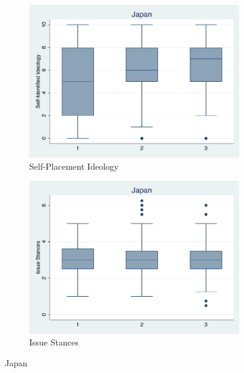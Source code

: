 \documentclass[12pt, titlepage]{article}
\begin{document}
\begin{figure}[H]
	\centering
	\begin{subfigure}[b]{0.475\textwidth}   
		\centering 
		\includegraphics[width=\textwidth]{IdeoBP/Japan}
		\caption{Self-Placement Ideology}
	\end{subfigure}
	\hfill
	\begin{subfigure}[b]{0.475\textwidth}
		\centering 
		\includegraphics[width=\textwidth]{BoxLib/Japan}
		\caption{Issue Stances}
	\end{subfigure}
	\caption{Japan}
	\label{Japan}
\end{figure}
\end{document}
